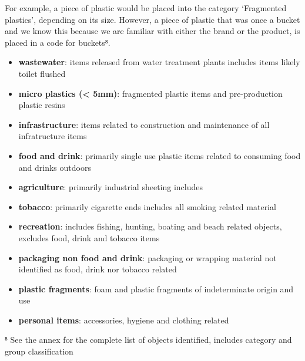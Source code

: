 \documentclass[11pt]{article}
\providecommand{\tightlist}{%
      \setlength{\itemsep}{0pt}\setlength{\parskip}{0pt}}
\begin{document}
For example, a piece of plastic would be placed into the category
`Fragmented plastics', depending on its size. However, a piece of
plastic that was once a bucket and we know this because we are familiar
with either the brand or the product, is placed in a code for buckets⁸.

\begin{itemize}
\tightlist
\item
  \textbf{wastewater}: items released from water treatment plants
  includes items likely toilet flushed\\
\item
  \textbf{micro plastics (\textless{} 5mm)}: fragmented plastic items
  and pre-production plastic resins
\item
  \textbf{infrastructure}: items related to construction and maintenance
  of all infratructure items
\item
  \textbf{food and drink}: primarily single use plastic items related to
  consuming food and drinks outdoors\\
\item
  \textbf{agriculture}: primarily industrial sheeting includes
\item
  \textbf{tobacco}: primarily cigarette ends includes all smoking
  related material
\item
  \textbf{recreation}: includes fishing, hunting, boating and beach
  related objects, excludes food, drink and tobacco items\\
\item
  \textbf{packaging non food and drink}: packaging or wrapping material
  not identified as food, drink nor tobacco related\\
\item
  \textbf{plastic fragments}: foam and plastic fragments of
  indeterminate origin and use
\item
  \textbf{personal items}: accessories, hygiene and clothing related
\end{itemize}

{⁸ See the annex for the complete list of objects identified, includes
category and group classification}

    \begin{center}
    \end{center}
    { \hspace*{\fill} \\}
    
\end{document}
